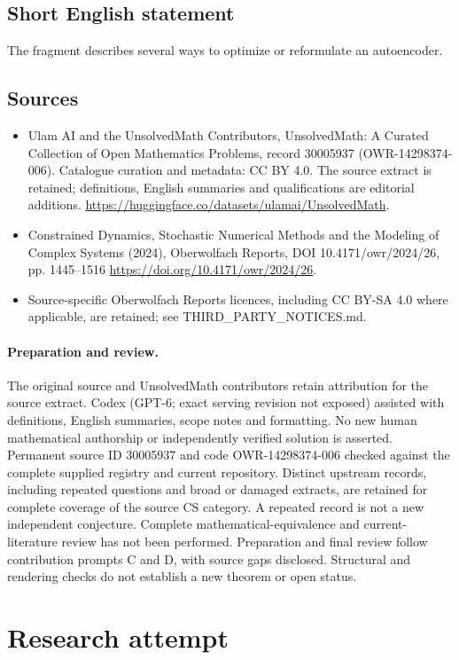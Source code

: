 \documentclass[11pt]{article}
\begin{document}
\subsection{Short English statement}
The fragment describes several ways to optimize or reformulate an autoencoder.
\subsection{Sources}
\begin{itemize}
\item[S1] Ulam AI and the UnsolvedMath Contributors, UnsolvedMath: A Curated Collection of Open Mathematics Problems, record 30005937 (OWR-14298374-006). Catalogue curation and metadata: CC BY 4.0. The source extract is retained; definitions, English summaries and qualifications are editorial additions.
\url{https://huggingface.co/datasets/ulamai/UnsolvedMath}.
\item[S2] Constrained Dynamics, Stochastic Numerical Methods and the Modeling of Complex Systems (2024), Oberwolfach Reports, DOI 10.4171/owr/2024/26, pp. 1445--1516
\url{https://doi.org/10.4171/owr/2024/26}.
\item Source-specific Oberwolfach Reports licences, including CC BY-SA 4.0 where applicable, are retained; see THIRD\_PARTY\_NOTICES.md.
\end{itemize}
\paragraph{Preparation and review.}
The original source and UnsolvedMath contributors retain attribution for the source extract. Codex (GPT-6; exact serving revision not exposed) assisted with definitions, English summaries, scope notes and formatting. No new human mathematical authorship or independently verified solution is asserted. Permanent source ID 30005937 and code OWR-14298374-006 checked against the complete supplied registry and current repository. Distinct upstream records, including repeated questions and broad or damaged extracts, are retained for complete coverage of the source CS category. A repeated record is not a new independent conjecture. Complete mathematical-equivalence and current-literature review has not been performed. Preparation and final review follow contribution prompts C and D, with source gaps disclosed. Structural and rendering checks do not establish a new theorem or open status.
\label{end:30005937}

\section{Research attempt}
\end{document}
